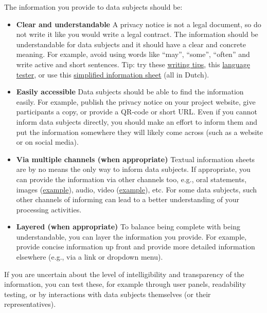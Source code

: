 \documentclass[
]{book}
\begin{document}
The information you provide to data subjects should be:

\begin{itemize}
\item
  \textbf{Clear and understandable}
  A privacy notice is not a legal document, so do not write it like you would
  write a legal contract. The information should be understandable for data
  subjects and it should have a clear and concrete meaning. For example, avoid
  using words like ``may'', ``some'', ``often'' and write active and short sentences.
  Tip: try these
  \href{https://www.researchplatform-dorp.nl/wp-content/uploads/20220329-Handleiding-PIF-beperkte_gezondheidsvaardigheden.pdf}{writing tips},
  this \href{https://ishetb1.nl/}{language tester}, or use this
  \href{https://www.pharos.nl/kennisbank/eenvoudige-en-begrijpelijke-onderzoeksformulieren-patientinformatieformulier-pif/}{simplified information sheet}
  (all in Dutch).
\item
  \textbf{Easily accessible}
  Data subjects should be able to find the information easily. For example, publish
  the privacy notice on your project website, give participants a copy, or provide
  a QR-code or short URL. Even if you cannot inform data subjects directly, you
  should make an effort to inform them and put the information somewhere they will
  likely come across (such as a website or on social media).
\item
  \textbf{Via multiple channels (when appropriate)}
  Textual information sheets are by no means the only way to inform data subjects.
  If appropriate, you can provide the information via other channels too, e.g.,
  oral statements, images
  (\href{https://irenececile.com/project/stripverhaal-wetenschappelijk-medicijnonderzoek-voor-kinderen-informed-consent/}{example}),
  audio, video
  (\href{https://www.youtube.com/watch?v=H5aMCfqw1Lw}{example}),
  etc. For some data subjects, such other channels of informing can lead to a better
  understanding of your processing activities.
\item
  \textbf{Layered (when appropriate)}
  To balance being complete with being understandable, you can layer the
  information you provide. For example, provide concise information up front and
  provide more detailed information elsewhere (e.g., via a link or dropdown menu).
\end{itemize}

If you are uncertain about the level of intelligibility and transparency of the
information, you can test these, for example through user panels, readability
testing, or by interactions with data subjects themselves (or their
representatives).
\end{document}
